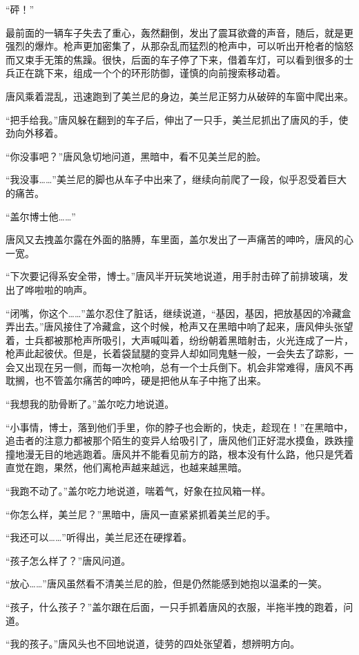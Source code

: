 “砰！”

最前面的一辆车子失去了重心，轰然翻倒，发出了震耳欲聋的声音，随后，就是更强烈的爆炸。枪声更加密集了，从那杂乱而猛烈的枪声中，可以听出开枪者的恼怒而又束手无策的焦躁。很快，后面的车子停了下来，借着车灯，可以看到很多的士兵正在跳下来，组成一个个的环形防御，谨慎的向前搜索移动着。

唐风乘着混乱，迅速跑到了美兰尼的身边，美兰尼正努力从破碎的车窗中爬出来。

“把手给我。”唐风躲在翻到的车子后，伸出了一只手，美兰尼抓出了唐风的手，使劲向外移着。

“你没事吧？”唐风急切地问道，黑暗中，看不见美兰尼的脸。

“我没事……”美兰尼的脚也从车子中出来了，继续向前爬了一段，似乎忍受着巨大的痛苦。

“盖尔博士他……”

唐风又去拽盖尔露在外面的胳膊，车里面，盖尔发出了一声痛苦的呻吟，唐风的心一宽。

“下次要记得系安全带，博士。”唐风半开玩笑地说道，用手肘击碎了前排玻璃，发出了哗啦啦的响声。

“闭嘴，你这个……”盖尔忍住了脏话，继续说道，“基因，基因，把放基因的冷藏盒弄出去。”唐风接住了冷藏盒，这个时候，枪声又在黑暗中响了起来，唐风伸头张望着，士兵都被那枪声所吸引，大声喊叫着，纷纷朝着黑暗射击，火光连成了一片，枪声此起彼伏。但是，长着袋鼠腿的变异人却如同鬼魅一般，一会失去了踪影，一会又出现在另一侧，而每一次枪响，总有一个士兵倒下。机会非常难得，唐风不再耽搁，也不管盖尔痛苦的呻吟，硬是把他从车子中拖了出来。

“我想我的肋骨断了。”盖尔吃力地说道。

“小事情，博士，落到他们手里，你的脖子也会断的，快走，趁现在！”在黑暗中，追击者的注意力都被那个陌生的变异人给吸引了，唐风他们正好混水摸鱼，跌跌撞撞地漫无目的地逃跑着。唐风并不能看见前方的路，根本没有什么路，他只是凭着直觉在跑，果然，他们离枪声越来越远，也越来越黑暗。

“我跑不动了。”盖尔吃力地说道，喘着气，好象在拉风箱一样。

“你怎么样，美兰尼？”黑暗中，唐风一直紧紧抓着美兰尼的手。

“我还可以……”听得出，美兰尼还在硬撑着。

“孩子怎么样了？”唐风问道。

“放心……”唐风虽然看不清美兰尼的脸，但是仍然能感到她抱以温柔的一笑。

“孩子，什么孩子？”盖尔跟在后面，一只手抓着唐风的衣服，半拖半拽的跑着，问道。

“我的孩子。”唐风头也不回地说道，徒劳的四处张望着，想辨明方向。

